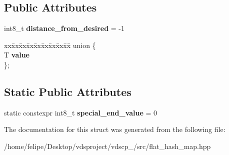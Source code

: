 \subsection*{Public Attributes}
\begin{DoxyCompactItemize}
\item 
int8\+\_\+t {\bfseries distance\+\_\+from\+\_\+desired} = -\/1\label{structska_1_1detailv3_1_1sherwood__v3__entry_a33c8fc50d1ef26cd5df87e0270294d65}

\item 
\begin{tabbing}
xx\=xx\=xx\=xx\=xx\=xx\=xx\=xx\=xx\=\kill
union \{\\
\>T {\bfseries value}\\
\}; \label{structska_1_1detailv3_1_1sherwood__v3__entry_a94fcdafe5cacfb7b6cbaea75b133a94b}
\\

\end{tabbing}\end{DoxyCompactItemize}
\subsection*{Static Public Attributes}
\begin{DoxyCompactItemize}
\item 
static constexpr int8\+\_\+t {\bfseries special\+\_\+end\+\_\+value} = 0\label{structska_1_1detailv3_1_1sherwood__v3__entry_a9cd804c1a2cb3caa07dcf22f113f7831}

\end{DoxyCompactItemize}


The documentation for this struct was generated from the following file\+:\begin{DoxyCompactItemize}
\item 
/home/felipe/\+Desktop/vdsproject/vdscp\+\_/src/flat\+\_\+hash\+\_\+map.\+hpp\end{DoxyCompactItemize}
